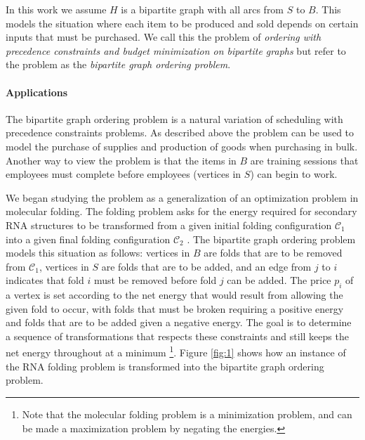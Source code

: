 \documentclass[letterpaper,11pt,abstracton]{scrartcl}
\begin{document}
In this work we assume $H$ is a bipartite graph with all arcs from
$S$ to $B$.  This models the situation where each item to be produced and
sold depends on certain inputs that must be purchased.
We call this the problem of \emph{ordering with precedence
  constraints and budget minimization on bipartite graphs} but refer
to the problem as the \emph{bipartite graph ordering problem}.

\paragraph{Applications}
The bipartite graph ordering problem is a natural variation of scheduling with
precedence constraints problems.  As described above the problem can be used
to model the purchase of supplies and production of goods when purchasing in
bulk.  Another way to view the problem is that the items in $B$ are training sessions that employees must complete before employees (vertices in $S$) can
begin to work.

We began studying the problem as a generalization of an optimization
problem in molecular folding.  The folding problem asks for the energy
required for secondary RNA structures to be transformed from a given
initial folding configuration $\mathcal{C}_1$ into a given final folding
configuration $\mathcal{C}_2$ \cite{GFWT08,MH98,TMRM09}. The bipartite graph ordering problem models
this situation as follows: vertices in $B$ are folds that are to be
removed from $\mathcal{C}_1$, vertices in $S$ are folds that are to be
added, and an edge from $j$ to $i$ indicates that fold $i$ must be
removed before fold $j$ can be added.  The price $p_i$ of a vertex is set
according to the net energy that would result from allowing the given
fold to occur, with folds that must be broken requiring a positive
energy and folds that are to be added given a negative energy.  The
goal is to determine a sequence of transformations that respects these
constraints and still keeps the net energy throughout at a minimum
\footnote{Note that the molecular folding problem is a minimization problem,
  and can be made a maximization problem by negating the energies.
}.
Figure \ref{fig:1} shows how an instance of the RNA folding problem is
transformed into the bipartite graph ordering problem.
\end{document}
